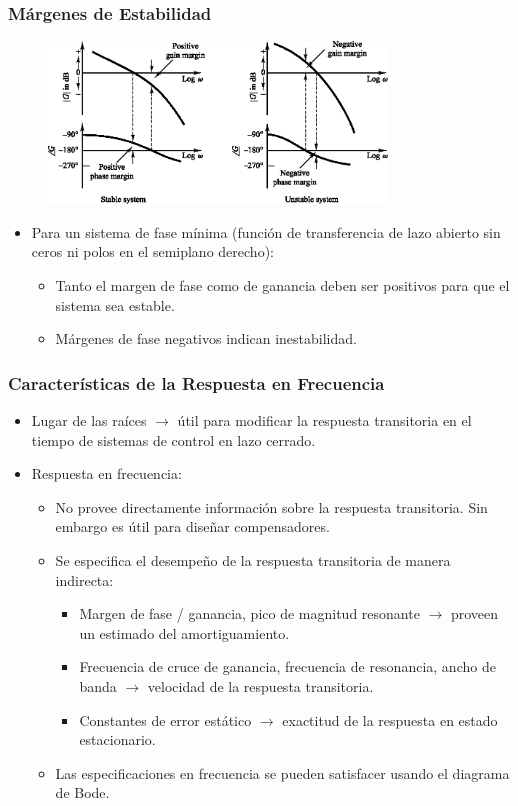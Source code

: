 \documentclass[aspectratio=169, handout]{beamer}
\theoremstyle{definition}
\theoremstyle{plain}
\theoremstyle{remark}
\begin{document}
\begin{frame}[<+->]\frametitle{Márgenes de Estabilidad}
	\begin{figure}
		\centering
		\includegraphics[width=9cm]{images/phaseGainMarginsStability.eps}
	\end{figure}
	\vspace*{-3mm}
	\begin{itemize}
		\item Para un sistema de fase mínima (función de transferencia de lazo abierto sin ceros ni polos en el semiplano derecho):
		\begin{itemize}
			\item Tanto el margen de fase como de ganancia deben ser positivos para que el sistema sea estable.
			\item Márgenes de fase negativos indican inestabilidad.
		\end{itemize}
	\end{itemize}
\end{frame}

\begin{frame}[<+->]\frametitle{Características de la Respuesta en Frecuencia}
	\begin{itemize}
		\item Lugar de las raíces $\rightarrow$ útil para modificar la respuesta transitoria en el tiempo de sistemas de control en lazo cerrado.
		\item Respuesta en frecuencia:
		\begin{itemize}
			\item No provee directamente información sobre la respuesta transitoria. Sin embargo es útil para diseñar compensadores.
			\item Se especifica el desempeño de la respuesta transitoria de manera indirecta:
			\begin{itemize}
				\item Margen de fase / ganancia, pico de magnitud resonante $\rightarrow$ proveen un estimado del amortiguamiento.
				\item Frecuencia de cruce de ganancia, frecuencia de resonancia, ancho de banda $\rightarrow$ velocidad de la respuesta transitoria.
				\item Constantes de error estático $\rightarrow$ exactitud de la respuesta en estado estacionario.
			\end{itemize}
			\item Las especificaciones en frecuencia se pueden satisfacer usando el diagrama de Bode.
		\end{itemize}
	\end{itemize}
\end{frame}
\end{document}
